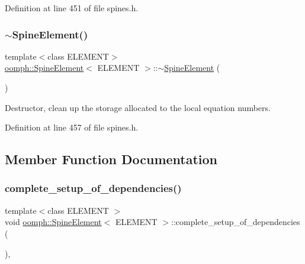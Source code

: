 Definition at line 451 of file spines.\+h.

\mbox{\label{classoomph_1_1SpineElement_a54acf4222f3807c53075beedd25ed824}} 
\subsubsection{\texorpdfstring{$\sim$\+Spine\+Element()}{~SpineElement()}}
{\footnotesize\ttfamily template$<$class E\+L\+E\+M\+E\+NT$>$ \\
\hyperlink{classoomph_1_1SpineElement}{oomph\+::\+Spine\+Element}$<$ E\+L\+E\+M\+E\+NT $>$\+::$\sim$\hyperlink{classoomph_1_1SpineElement}{Spine\+Element} (\begin{DoxyParamCaption}{ }\end{DoxyParamCaption})\hspace{0.3cm}{\ttfamily [inline]}}



Destructor, clean up the storage allocated to the local equation numbers. 



Definition at line 457 of file spines.\+h.



\subsection{Member Function Documentation}
\mbox{\label{classoomph_1_1SpineElement_a867b5e4eb64d60da9585f8a791fbac36}} 
\subsubsection{\texorpdfstring{complete\+\_\+setup\+\_\+of\+\_\+dependencies()}{complete\_setup\_of\_dependencies()}}
{\footnotesize\ttfamily template$<$class E\+L\+E\+M\+E\+NT $>$ \\
void \hyperlink{classoomph_1_1SpineElement}{oomph\+::\+Spine\+Element}$<$ E\+L\+E\+M\+E\+NT $>$\+::complete\+\_\+setup\+\_\+of\+\_\+dependencies (\begin{DoxyParamCaption}{ }\end{DoxyParamCaption})\hspace{0.3cm}{\ttfamily [private]}, {\ttfamily [virtual]}}



